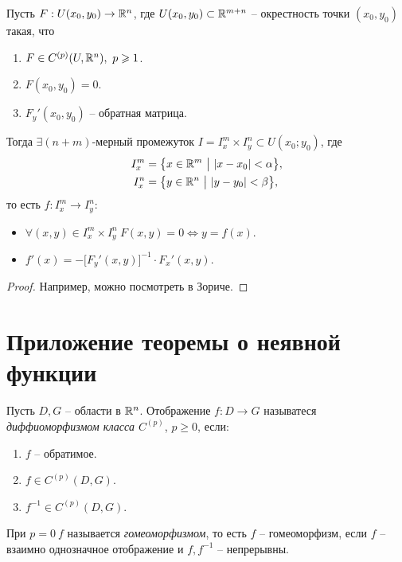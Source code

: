 \begin{theorem}
    Пусть $ F:U(x_0,y_0) \rightarrow \mathbb{R}^n $, где $ U(x_0,y_0) \subset \mathbb{R}^{m+n} $ -- окрестность точки $ (x_0,y_0) $ такая, что
    \begin{enumerate}
        \item $ F\in C^{(p)}(U,\mathbb{R}^n), \ p \geqslant 1 $.
        \item $ F(x_0,y_0) = 0 $.
        \item $ F_y'(x_0,y_0) $ -- обратная матрица.
    \end{enumerate}

    Тогда $ \exists (n+m) $-мерный промежуток $ I = I_x^m \times I_y^n \subset U(x_0;y_0) $, где
    \begin{align*}
        I_x^m & = \big\{x\in \mathbb{R}^m \ \big| \ |x - x_0| < \alpha \big\}, \\
        I_x^n & = \big\{y\in \mathbb{R}^n \ \big| \ |y - y_0| < \beta \big\},
    \end{align*} то есть $ f:I_x^m \rightarrow I_y^n $:
    \begin{itemize}
        \item $ \forall (x,y) \in I_x^m \times I_y^n \ F(x,y) = 0 \iff y = f(x) $.
        \item $ f'(x) = -\big[F_y'(x,y)\big]^{-1} \cdot F_x'(x,y) $.
    \end{itemize}
\end{theorem}

\begin{proof}
    Например, можно посмотреть в Зориче.
\end{proof}

\section{Приложение теоремы о неявной функции}

\begin{definition}
    Пусть $ D,G $ -- области в $ \mathbb{R}^n $. Отображение $ f:D \rightarrow G $ называтеся \emph{диффиоморфизмом класса $ C^{(p)} $}, $ p \geqslant 0 $, если:
    \begin{enumerate}
        \item $ f $ -- обратимое.
        \item $ f \in C^{(p)}(D,G) $.
        \item $ f^{-1} \in C^{(p)}(D,G) $.
    \end{enumerate}

    При $ p=0 \ f $ называется \emph{гомеоморфизмом}, то есть $ f $ -- гомеоморфизм, если $ f $ -- взаимно однозначное отображение и $ f,f^{-1} $ -- непрерывны.
\end{definition}


